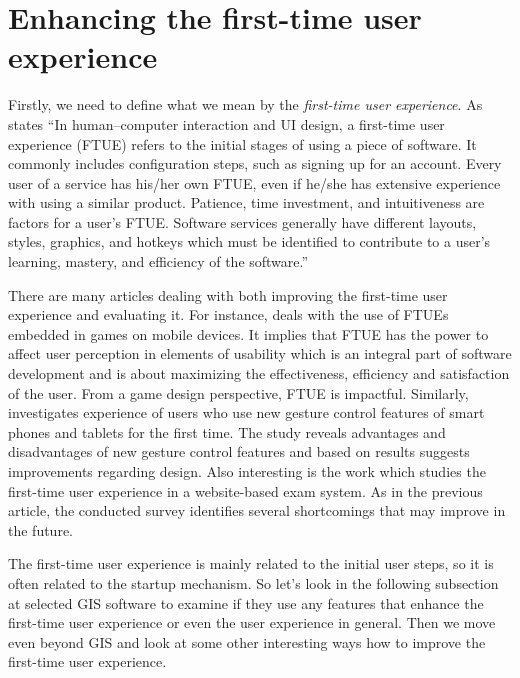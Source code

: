 \documentclass[a4paper,10pt,twoside]{article}
\begin{document}
\newpage
\vspace*{-1cm}
\section{Enhancing the first-time user experience}
\label{subsection:enhancing}

Firstly, we need to define what we mean by the \textit{first-time user experience}. As \cite{ftue} states ``In human–computer interaction and UI design, a first-time user experience (FTUE) refers to the initial stages of using a piece of software. It commonly includes configuration steps, such as signing up for an account. Every user of a service has his/her own FTUE, even if he/she has extensive experience with using a similar product. Patience, time investment, and intuitiveness are factors for a user's FTUE. Software services generally have different layouts, styles, graphics, and hotkeys which must be identified to contribute to a user's learning, mastery, and efficiency of the software.'' 

There are many articles dealing with both improving the first-time user experience and evaluating it. For instance, \cite{BARNETT201882} deals with the use of FTUEs embedded in games on mobile devices. It implies that FTUE has the power to affect user perception in elements of usability which is an integral part of software development and is about maximizing the effectiveness, efficiency and satisfaction of the user. From a game design perspective, FTUE is impactful. Similarly, \cite{smartphones} investigates experience of users who use new gesture control features of smart phones and tablets for the first time. The study reveals advantages and disadvantages of new gesture control features and based on results suggests improvements regarding design. Also interesting is the work \cite{onlineexamination} which studies the first-time user experience in a website-based exam system. As in the previous article, the conducted survey identifies several shortcomings that may improve in the future.

The first-time user experience is mainly related to the initial user steps, so it is often related to the startup mechanism. So let's look in the following subsection at selected GIS software to examine if they use any features that enhance the first-time user experience or even the user experience in general. Then we move even beyond GIS and look at some other interesting ways how to improve the first-time user experience.
\end{document}
